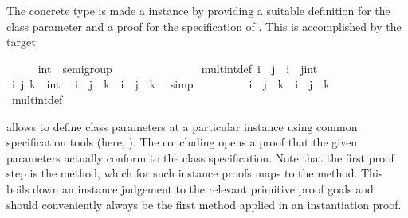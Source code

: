 \begin{isabellebody}
{}
\isamarkuptrue%
%
\begin{isamarkuptext}%
The concrete type  is made a 
  instance by providing a suitable definition for the class parameter
   and a proof for the specification of .
  This is accomplished by the \isa{{\isasymINSTANTIATION}} target:%
\end{isamarkuptext}%
\isamarkuptrue%
\ \ \ \ \isamarkupfalse%
\ int\ {\isacharcolon}{\isacharcolon}\ semigroup\isanewline
\ \ \ \ \isanewline
\isanewline
\ \ \ \ \isamarkupfalse%
\isanewline
\ \ \ \ \ \ mult{\isacharunderscore}int{\isacharunderscore}def{\isacharcolon}\ {\isachardoublequoteopen}i\ {\isasymotimes}\ j\ {\isacharequal}\ i\ {\isacharplus}\ {\isacharparenleft}j{\isasymColon}int{\isacharparenright}{\isachardoublequoteclose}\isanewline
\isanewline
\ \ \ \ \isamarkupfalse%
%
\isadelimproof
\ %
\endisadelimproof
%
\isatagproof
{}\isamarkupfalse%
\isanewline
\ \ \ \ \ \ \isamarkupfalse%
\ i\ j\ k\ {\isacharcolon}{\isacharcolon}\ int\ \isamarkupfalse%
\ {\isachardoublequoteopen}{\isacharparenleft}i\ {\isacharplus}\ j{\isacharparenright}\ {\isacharplus}\ k\ {\isacharequal}\ i\ {\isacharplus}\ {\isacharparenleft}j\ {\isacharplus}\ k{\isacharparenright}{\isachardoublequoteclose}\ \isamarkupfalse%
\ simp\isanewline
\ \ \ \ \ \ \isamarkupfalse%
\ \isamarkupfalse%
\ {\isachardoublequoteopen}{\isacharparenleft}i\ {\isasymotimes}\ j{\isacharparenright}\ {\isasymotimes}\ k\ {\isacharequal}\ i\ {\isasymotimes}\ {\isacharparenleft}j\ {\isasymotimes}\ k{\isacharparenright}{\isachardoublequoteclose}\isanewline
\ \ \ \ \ \ \ \ \isamarkupfalse%
\ mult{\isacharunderscore}int{\isacharunderscore}def\ \isacommand{{\isachardot}}\isamarkupfalse%
\isanewline
\ \ \ \ \isamarkupfalse%
%
\endisatagproof
{\isafoldproof}%
%
\isadelimproof
%
\endisadelimproof
\isanewline
\isanewline
\ \ \ \ \isamarkupfalse%
%
\begin{isamarkuptext}%
\noindent \isa{{\isasymINSTANTIATION}} allows to define class parameters
  at a particular instance using common specification tools (here,
  \isa{{\isasymDEFINITION}}).  The concluding \isa{{\isasymINSTANCE}}
  opens a proof that the given parameters actually conform
  to the class specification.  Note that the first proof step
  is the  method,
  which for such instance proofs maps to the  method.
  This boils down an instance judgement to the relevant primitive
  proof goals and should conveniently always be the first method applied
  in an instantiation proof.


\end{isamarkuptext}
\end{isabellebody}
